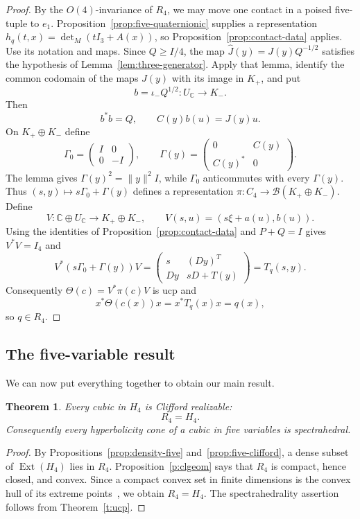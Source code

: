 \documentclass[11pt,onecolumn]{article}
\theoremstyle{blueplain}
\newtheorem{theorem}{Theorem}[section]
\theoremstyle{bluedefinition}
\theoremstyle{bluedefinition}
\newcommand{\C}{\mathbb C}
\begin{document}
\begin{proof}
By the $O(4)$-invariance of $R_4$, we may move one contact in a poised
five-tuple to $e_1$.  Proposition~\ref{prop:five-quaternionic} supplies
a representation $h_q(t,x)=\det_M(tI_3+A(x))$, so
Proposition~\ref{prop:contact-data} applies.  Use its notation and maps.
Since $Q\geqslant I/4$, the map
$\widehat J(y)=J(y)Q^{-1/2}$ satisfies the hypothesis of
Lemma~\ref{lem:three-generator}.  Apply that lemma, identify the
common codomain of the maps $J(y)$ with its image in $K_+$, and put
\[
 b=\iota_-Q^{1/2}\colon U_{\mathbb C}\to K_-.
\]
Then
\[
 b^*b=Q,
 \qquad C(y)b(u)=J(y)u.
\]
On $K_+\oplus K_-$ define
\[
 \Gamma_0=\begin{pmatrix}I&0\\0&-I\end{pmatrix},
 \qquad
 \Gamma(y)=\begin{pmatrix}0&C(y)\\C(y)^*&0\end{pmatrix}.
\]
The lemma gives $\Gamma(y)^2=\|y\|^2I$, while $\Gamma_0$ anticommutes
with every $\Gamma(y)$.  Thus $(s,y)\mapsto s\Gamma_0+\Gamma(y)$ defines
a representation $\pi\colon C_4\to\mathcal B(K_+\oplus K_-)$.  Define
\[
 V\colon\mathbb C\oplus U_{\mathbb C}\to K_+\oplus K_-,
 \qquad
 V(s,u)=(s\xi+a(u),b(u)).
\]
Using the identities of Proposition~\ref{prop:contact-data} and $P+Q=I$
gives $V^*V=I_4$ and
\[
 V^*(s\Gamma_0+\Gamma(y))V
 =\begin{pmatrix}s&(Dy)^T\\Dy&sD+T(y)\end{pmatrix}
 =T_q(s,y).
\]
Consequently $\Theta(c)=V^*\pi(c)V$ is ucp and
\[
 x^*\Theta(c(x))x=x^*T_q(x)x=q(x),
\]
so $q\in R_4$.
\end{proof}

\subsection{The five-variable result}

We can now put everything together to obtain our main result.

\begin{theorem}
\label{thm:R4H4}
Every cubic in $H_4$ is Clifford realizable:
\[
 R_4=H_4.
\]
Consequently every hyperbolicity cone of a cubic in five variables is
spectrahedral.
\end{theorem}

\begin{proof}
By Propositions~\ref{prop:density-five}
and~\ref{prop:five-clifford}, a dense subset of
$\operatorname{Ext}(H_4)$ lies in $R_4$.  Proposition~\ref{p:clgeom} says
that $R_4$ is compact, hence closed, and convex.  
Since a compact convex set in finite dimensions is the convex hull of
its extreme points~\cite{Rockafellar}, we obtain $R_4=H_4$.
The spectrahedrality assertion follows from
Theorem~\ref{t:ucp}.
\end{proof}
\end{document}
